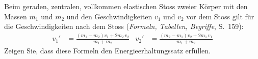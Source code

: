 Beim geraden, zentralen, vollkommen elastischen Stoss zweier Körper mit den Massen $m_1$ und $m_2$ und den Geschwindigkeiten $v_1$ und $v_2$ vor dem Stoss gilt für die Geschwindigkeiten nach dem Stoss (\emph{Formeln, Tabellen, Begriffe}, S.~159):
\begin{align}
 v_1' &= \frac{\left(m_1-m_2\right)v_1+2m_2\,v_2}{m_1+m_2} &
 v_2' &= \frac{\left(m_2-m_1\right)v_2+2m_1\,v_1}{m_1+m_2}
\end{align}
Zeigen Sie, dass diese Formeln den Energieerhaltungssatz erfüllen.
